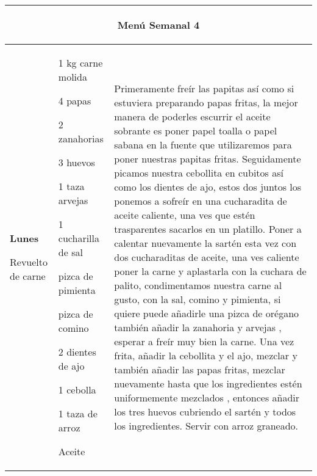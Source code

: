 \documentclass[menu.tex]{subfiles}
\begin{document}
    
\begin{tabular} {p{3cm} p{4.5cm} p{9cm}} 
\multicolumn{3}{c}{\begin{LARGE}Menú Semanal 4\end{LARGE}}\\
\hline

\pbox{20cm}
{
    \rule{0pt}{3ex}\begin{large}\textbf{Lunes}\end{large}\\ 
    \rule{0pt}{2ex}Revuelto de carne
} & 
\vspace{-0.3cm}            
\begin{compactitem} 
    \begin{scriptsize}
        \item 1 kg carne molida
        \item 4 papas
        \item 2 zanahorias
        \item 3 huevos
        \item 1 taza arvejas
        \item 1 cucharilla de sal
        \item pizca de pimienta
        \item pizca de comino
        \item 2 dientes de ajo
        \item 1 cebolla
        \item 1 taza de arroz
        \item Aceite
    \end{scriptsize}
\end{compactitem}&
\vspace{-0.3cm}
Primeramente freír las papitas así como si estuviera preparando papas fritas, la mejor manera de poderles escurrir el aceite sobrante es poner papel toalla o papel sabana en la fuente que utilizaremos para poner nuestras papitas fritas. Seguidamente picamos nuestra cebollita en cubitos así como los dientes de ajo, estos dos juntos los ponemos a sofreír en una cucharadita de aceite caliente, una ves que estén trasparentes sacarlos en un platillo. Poner a calentar nuevamente la sartén esta vez con dos cucharaditas de aceite, una ves caliente poner la carne y aplastarla con la cuchara de palito, condimentamos nuestra carne al gusto, con la sal, comino y pimienta, si quiere puede añadirle una pizca de orégano también añadir la zanahoria y arvejas , esperar a freír muy bien la carne. Una vez frita, añadir la cebollita y el ajo, mezclar y también añadir las papas fritas, mezclar nuevamente hasta que los ingredientes estén uniformemente mezclados , entonces añadir los tres huevos cubriendo el sartén y todos los ingredientes. Servir con arroz graneado.\\
\hline


\end{tabular}
\end{document}
